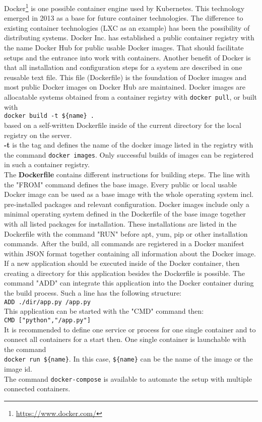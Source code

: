 Docker\footnote{\url{https://www.docker.com/}} is one possible container engine used by Kubernetes. This technology emerged in 2013 as a base for future container technologies. 
The difference to existing container technologies (LXC as an example) has been the possibility of distributing systems. 
Docker Inc. has established a public container registry with the name Docker Hub for public usable Docker images. That should facilitate setups and the entrance into work with containers. Another benefit of Docker is that all installation and configuration steps for a system are described in one reusable text file. 
This file (Dockerfile) is the foundation of Docker images and most public Docker images on Docker Hub are maintained.
Docker images are allocatable systems obtained from a container registry with \lstinline!docker pull!, or built with \\ \lstinline!docker build -t ${name} .! \\
based on a self-written Dockerfile inside of the current directory for the local registry on the server. \\ 
\textbf{-t} is the tag and defines the name of the docker image listed in the registry with the command \lstinline!docker images!. Only successful builds of images can be registered in such a container registry. \\
The \textbf{Dockerfile} contains different instructions for building steps. The line with the "FROM" command defines the base image. Every public or local usable Docker image can be used as a base image with the whole operating system incl. pre-installed packages and relevant configuration. Docker images include only a minimal operating system defined in the Dockerfile of the base image together with all listed packages for installation. These installations are listed in the Dockerfile with the command "RUN" before apt, yum, pip or other installation commands. 
After the build, all commands are registered in a Docker manifest within JSON format together containing all information about the Docker image.
If a new application should be executed inside of the Docker container, then creating a directory for this application besides the Dockerfile is possible. The command "ADD" can integrate this application into the Docker container during the build process. Such a line has the following structure: \\
\lstinline!ADD ./dir/app.py /app.py! \\
This application can be started with the "CMD" command then: \\
\lstinline!CMD ["python","/app.py"]! \\
It is recommended to define one service or process for one single container and to connect all containers for a start then. One single container is launchable with the command \\
\lstinline!docker run ${name}!. In this case, \lstinline!${name}! can be the name of the image or the image id. \\
The command \lstinline!docker-compose! is available to automate the setup with multiple connected containers. 

